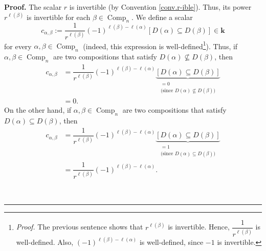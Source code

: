 \documentclass[numbers=enddot,12pt,final,onecolumn,notitlepage]{scrartcl}%
\theoremstyle{definition}
\newenvironment{proof}[1][Proof]{\noindent\textbf{#1.} }{\ \rule{0.5em}{0.5em}}
\newenvironment{verlong}{}{}
\begin{document}
\begin{proof}
\begin{verlong}
The scalar $r$ is invertible (by Convention \ref{conv.r-ible}). Thus, its
power $r^{\ell\left(  \beta\right)  }$ is invertible for each $\beta
\in\operatorname*{Comp}\nolimits_{n}$. We define a scalar%
\[
c_{\alpha,\beta}:=\dfrac{1}{r^{\ell\left(  \beta\right)  }}\left(  -1\right)
^{\ell\left(  \beta\right)  -\ell\left(  \alpha\right)  }\left[  D\left(
\alpha\right)  \subseteq D\left(  \beta\right)  \right]  \in\mathbf{k}%
\]
for every $\alpha,\beta\in\operatorname*{Comp}\nolimits_{n}$ (indeed, this
expression is well-defined\footnote{\textit{Proof.} The previous sentence
shows that $r^{\ell\left(  \beta\right)  }$ is invertible. Hence, $\dfrac
{1}{r^{\ell\left(  \beta\right)  }}$ is well-defined. Also, $\left(
-1\right)  ^{\ell\left(  \beta\right)  -\ell\left(  \alpha\right)  }$ is
well-defined, since $-1$ is invertible.}). Thus, if $\alpha,\beta
\in\operatorname*{Comp}\nolimits_{n}$ are two compositions that satisfy
$D\left(  \alpha\right)  \not \subseteq D\left(  \beta\right)  $, then%
\begin{align}
c_{\alpha,\beta}  &  =\dfrac{1}{r^{\ell\left(  \beta\right)  }}\left(
-1\right)  ^{\ell\left(  \beta\right)  -\ell\left(  \alpha\right)
}\underbrace{\left[  D\left(  \alpha\right)  \subseteq D\left(  \beta\right)
\right]  }_{\substack{=0\\\text{(since }D\left(  \alpha\right)
\not \subseteq D\left(  \beta\right)  \text{)}}}\nonumber\\
&  =0. \label{pf.prop.etastar-dual-basis.c=0}%
\end{align}
On the other hand, if $\alpha,\beta\in\operatorname*{Comp}\nolimits_{n}$ are
two compositions that satisfy $D\left(  \alpha\right)  \subseteq D\left(
\beta\right)  $, then%
\begin{align}
c_{\alpha,\beta}  &  =\dfrac{1}{r^{\ell\left(  \beta\right)  }}\left(
-1\right)  ^{\ell\left(  \beta\right)  -\ell\left(  \alpha\right)
}\underbrace{\left[  D\left(  \alpha\right)  \subseteq D\left(  \beta\right)
\right]  }_{\substack{=1\\\text{(since }D\left(  \alpha\right)  \subseteq
D\left(  \beta\right)  \text{)}}}\nonumber\\
&  =\dfrac{1}{r^{\ell\left(  \beta\right)  }}\left(  -1\right)  ^{\ell\left(
\beta\right)  -\ell\left(  \alpha\right)  }.
\label{pf.prop.etastar-dual-basis.c=1}%
\end{align}

\end{verlong}


\end{proof}
\end{document}
